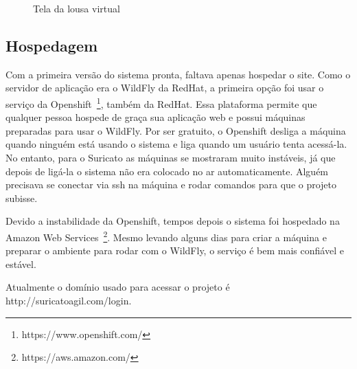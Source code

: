 \begin{figure}[H]
  \centering
  \caption{Tela da lousa virtual}\label{figura:Retrospectiva}
\end{figure}

\subsection{Hospedagem}

Com a primeira versão do sistema pronta, faltava apenas hospedar o site. Como o servidor de aplicação era o WildFly da RedHat, a primeira opção foi usar o serviço da Openshift~\footnote{https://www.openshift.com/}, também da RedHat. Essa plataforma permite que qualquer pessoa hospede de graça sua aplicação web e possui máquinas preparadas para usar o WildFly. Por ser gratuito, o Openshift desliga a máquina quando ninguém está usando o sistema e liga quando um usuário tenta acessá-la. No entanto, para o Suricato as máquinas se mostraram muito instáveis, já que depois de ligá-la o sistema não era colocado no ar automaticamente. Alguém precisava se conectar via ssh na máquina e rodar comandos para que o projeto subisse.

Devido a instabilidade da Openshift, tempos depois o sistema foi hospedado na Amazon Web Services~\footnote{https://aws.amazon.com/}. Mesmo levando alguns dias para criar a máquina e preparar o ambiente para rodar com o WildFly, o serviço é bem mais confiável e estável.

Atualmente o domínio usado para acessar o projeto é http://suricatoagil.com/login.